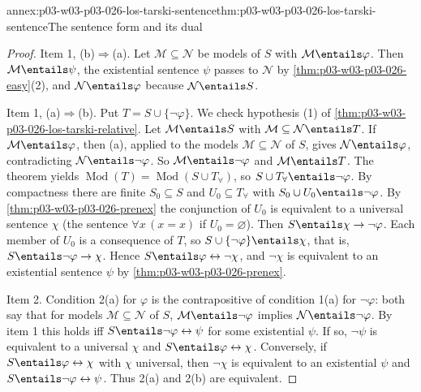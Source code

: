\begin{annexitem}{annex:p03-w03-p03-026-los-tarski-sentence}{thm:p03-w03-p03-026-los-tarski-sentence}{The sentence form and its dual}
\begin{proof}
Item 1, (b)\(\Rightarrow\)(a).  Let \(\mathcal M\subseteq\mathcal N\) be
models of \(S\) with \(\mathcal M\entails\varphi\).  Then
\(\mathcal M\entails\psi\), the existential sentence \(\psi\) passes to
\(\mathcal N\) by \cref{thm:p03-w03-p03-026-easy}(2), and
\(\mathcal N\entails\varphi\) because \(\mathcal N\entails S\).

Item 1, (a)\(\Rightarrow\)(b).  Put \(T=S\cup\{\neg\varphi\}\).  We check
hypothesis (1) of \cref{thm:p03-w03-p03-026-los-tarski-relative}.  Let
\(\mathcal M\entails S\) with \(\mathcal M\subseteq\mathcal N\entails T\).
If \(\mathcal M\entails\varphi\), then (a), applied to the models
\(\mathcal M\subseteq\mathcal N\) of \(S\), gives
\(\mathcal N\entails\varphi\), contradicting \(\mathcal N\entails\neg\varphi\).
So \(\mathcal M\entails\neg\varphi\) and \(\mathcal M\entails T\).  The
theorem yields \(\operatorname{Mod}(T)=\operatorname{Mod}(S\cup T_{\forall})\),
so \(S\cup T_{\forall}\entails\neg\varphi\).  By compactness there are finite
\(S_0\subseteq S\) and \(U_0\subseteq T_{\forall}\) with
\(S_0\cup U_0\entails\neg\varphi\).  By
\cref{thm:p03-w03-p03-026-prenex} the conjunction of \(U_0\) is equivalent to
a universal sentence \(\chi\) (the sentence \(\forall x\,(x=x)\) if
\(U_0=\varnothing\)).  Then \(S\entails\chi\to\neg\varphi\).  Each member of
\(U_0\) is a consequence of \(T\), so \(S\cup\{\neg\varphi\}\entails\chi\),
that is, \(S\entails\neg\varphi\to\chi\).  Hence
\(S\entails\varphi\leftrightarrow\neg\chi\), and \(\neg\chi\) is equivalent
to an existential sentence \(\psi\) by \cref{thm:p03-w03-p03-026-prenex}.

Item 2.  Condition 2(a) for \(\varphi\) is the contrapositive of condition
1(a) for \(\neg\varphi\): both say that for models
\(\mathcal M\subseteq\mathcal N\) of \(S\), \(\mathcal M\entails\neg\varphi\)
implies \(\mathcal N\entails\neg\varphi\).  By item 1 this holds iff
\(S\entails\neg\varphi\leftrightarrow\psi\) for some existential \(\psi\).
If so, \(\neg\psi\) is equivalent to a universal \(\chi\) and
\(S\entails\varphi\leftrightarrow\chi\).  Conversely, if
\(S\entails\varphi\leftrightarrow\chi\) with \(\chi\) universal, then
\(\neg\chi\) is equivalent to an existential \(\psi\) and
\(S\entails\neg\varphi\leftrightarrow\psi\).  Thus 2(a) and 2(b) are
equivalent.
\end{proof}
\end{annexitem}

